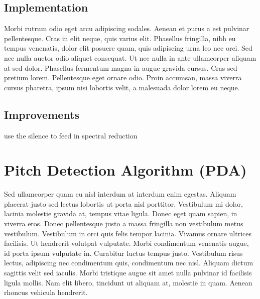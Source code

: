 \subsection{Implementation}
Morbi rutrum odio eget arcu adipiscing sodales. Aenean et purus a est pulvinar pellentesque. Cras in elit neque, quis varius elit. Phasellus fringilla, nibh eu tempus venenatis, dolor elit posuere quam, quis adipiscing urna leo nec orci. Sed nec nulla auctor odio aliquet consequat. Ut nec nulla in ante ullamcorper aliquam at sed dolor. Phasellus fermentum magna in augue gravida cursus. Cras sed pretium lorem. Pellentesque eget ornare odio. Proin accumsan, massa viverra cursus pharetra, ipsum nisi lobortis velit, a malesuada dolor lorem eu neque.


\subsection{Improvements}
use the silence to feed in spectral reduction


\section{Pitch Detection Algorithm (PDA)}

Sed ullamcorper quam eu nisl interdum at interdum enim egestas. Aliquam placerat justo sed lectus lobortis ut porta nisl porttitor. Vestibulum mi dolor, lacinia molestie gravida at, tempus vitae ligula. Donec eget quam sapien, in viverra eros. Donec pellentesque justo a massa fringilla non vestibulum metus vestibulum. Vestibulum in orci quis felis tempor lacinia. Vivamus ornare ultrices facilisis. Ut hendrerit volutpat vulputate. Morbi condimentum venenatis augue, id porta ipsum vulputate in. Curabitur luctus tempus justo. Vestibulum risus lectus, adipiscing nec condimentum quis, condimentum nec nisl. Aliquam dictum sagittis velit sed iaculis. Morbi tristique augue sit amet nulla pulvinar id facilisis ligula mollis. Nam elit libero, tincidunt ut aliquam at, molestie in quam. Aenean rhoncus vehicula hendrerit.

